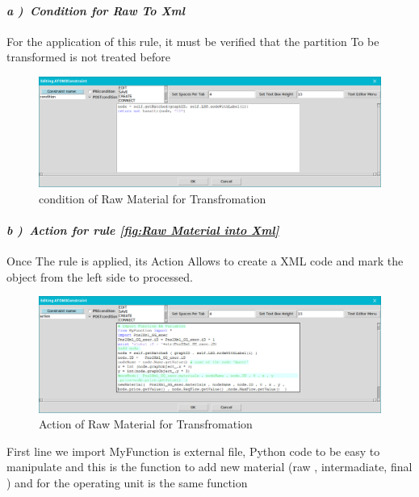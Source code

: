 \paragraph{\emph{ a )~Condition for Raw To Xml  } } For the application of this rule, it must be verified that the partition To be transformed is not treated before
\vspace{1cm}
\begin{figure}[th]
	\centering  %
 	\includegraphics[scale=0.38]{ch3/img/xcond1}
	\caption{\label{fig:condition of Raw Material for Transfromation}condition of Raw Material for Transfromation}
\end{figure}
\pagebreak
\paragraph{\emph{ b )~Action for rule \ref{fig:Raw Material into Xml} } }  Once 
The rule is applied, its Action Allows to create a XML code and mark the object from the left side to processed.  
 
\begin{figure}[th]
	\centering  %
 	\includegraphics[scale=0.38]{ch3/img/xact1}
	\caption{\label{fig:Action of Raw Material for Transfromation}Action of Raw Material for Transfromation}
\end{figure}  
First line we import MyFunction is external file, Python code 
to be easy to manipulate  and this is the function to add new material (raw ,
intermadiate, final ) 
and for the operating unit is the same function
 
